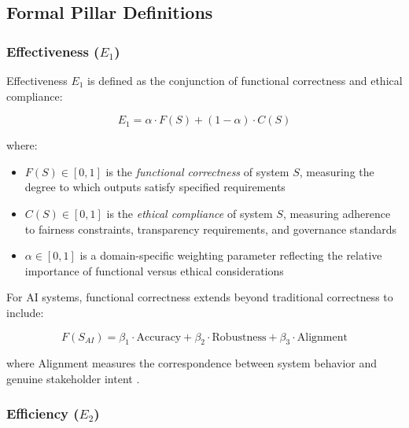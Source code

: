 \subsection{Formal Pillar Definitions}

\subsubsection{Effectiveness (\texorpdfstring{$E_1$}{E1})}

\begin{definition}[Effectiveness]
\label{def:effectiveness}
Effectiveness $E_1$ is defined as the conjunction of functional correctness and ethical compliance:

\begin{equation}
E_1 = \alpha \cdot F(S) + (1 - \alpha) \cdot C(S)
\end{equation}

where:
\begin{itemize}[leftmargin=2em]
    \item $F(S) \in [0,1]$ is the \emph{functional correctness} of system $S$, measuring the degree to which outputs satisfy specified requirements
    \item $C(S) \in [0,1]$ is the \emph{ethical compliance} of system $S$, measuring adherence to fairness constraints, transparency requirements, and governance standards
    \item $\alpha \in [0,1]$ is a domain-specific weighting parameter reflecting the relative importance of functional versus ethical considerations
\end{itemize}

For AI systems, functional correctness extends beyond traditional correctness to include:

\begin{equation}
F(S_{AI}) = \beta_1 \cdot \text{Accuracy} + \beta_2 \cdot \text{Robustness} + \beta_3 \cdot \text{Alignment}
\end{equation}

where Alignment measures the correspondence between system behavior and genuine stakeholder intent \cite{russell2019human}.
\end{definition}

\subsubsection{Efficiency (\texorpdfstring{$E_2$}{E2})}


